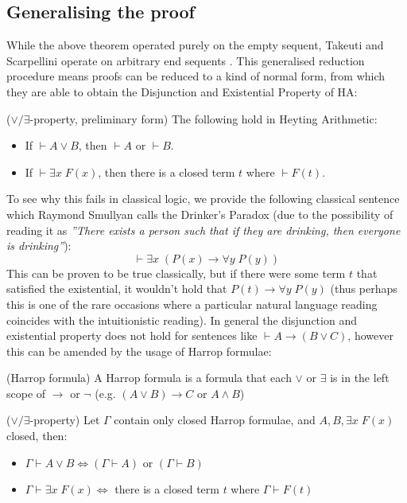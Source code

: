 \subsection{Generalising the proof}

While the above theorem operated purely on the empty sequent, Takeuti and Scarpellini operate on arbitrary end sequents \cite{TAK87,SCA69}.  This generalised reduction procedure means proofs can be reduced to a kind of normal form, from which they are able to obtain the Disjunction and Existential Property of HA:

\begin{cthdefinition}{($\lor/\exists$-property, preliminary form)}
    The following hold in Heyting Arithmetic:
    \begin{itemize}
        \item If $\vdash A \lor B$, then $\vdash A$ or $\vdash B$.
        \item If $\vdash \exists x\;F(x)$, then there is a closed term $t$ where $\vdash F(t)$.
    \end{itemize}
\end{cthdefinition}

To see why this fails in classical logic, we provide the following classical sentence which Raymond Smullyan calls the Drinker's Paradox (due to the possibility of reading it as \emph{''There exists a person such that if they are drinking, then everyone is drinking''}):
\[ \vdash \exists x \; (P(x) \to \forall y \; P(y)) \]
This can be proven to be true classically, but if there were some term $t$ that satisfied the existential, it wouldn't hold that $P(t) \to \forall y \; P(y)$ (thus perhaps this is one of the rare occasions where a particular natural language reading coincides with the intuitionistic reading). In general the disjunction and existential property does not hold for sentences like $\vdash A \to (B \lor C)$, however this can be amended by the usage of Harrop formulae:

\begin{cthdefinition}{(Harrop formula)}
    A Harrop formula is a formula that each $\lor$ or $\exists$ is in the left scope of $\to$ or $\lnot$ (e.g. $(A \lor B) \to C$ or $A \land B$)
\end{cthdefinition}

\begin{cththeorem}{($\lor/\exists$-property)}
    Let $\Gamma$ contain only closed Harrop formulae, and $A,B, \exists x\; F(x)$ closed, then:
    \begin{itemize}
        \item $\Gamma \vdash A \lor B \iff \left(\Gamma \vdash A\right) \text{ or } \left(\Gamma \vdash B\right)$
        \item $\Gamma \vdash  \exists x\; F(x) \iff$ there is a closed term $t$ where $\Gamma \vdash F(t)$
    \end{itemize}
\end{cththeorem}

